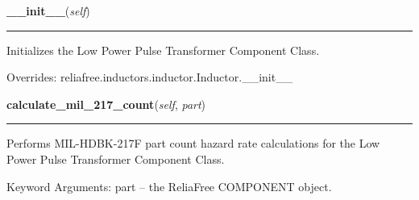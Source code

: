 \hspace{.8\funcindent}\begin{boxedminipage}{\funcwidth}

    \raggedright \textbf{\_\_init\_\_}(\textit{self})

    \vspace{-1.5ex}

    \rule{\textwidth}{0.5\fboxrule}
\setlength{\parskip}{2ex}
    Initializes the Low Power Pulse Transformer Component Class.

\setlength{\parskip}{1ex}
      Overrides: reliafree.inductors.inductor.Inductor.\_\_init\_\_

    \end{boxedminipage}

    \label{reliafree:inductors:transformer:LowPowerPulse:calculate_mil_217_count}

    \vspace{0.5ex}

\hspace{.8\funcindent}\begin{boxedminipage}{\funcwidth}

    \raggedright \textbf{calculate\_mil\_217\_count}(\textit{self}, \textit{part})

    \vspace{-1.5ex}

    \rule{\textwidth}{0.5\fboxrule}
\setlength{\parskip}{2ex}
    Performs MIL-HDBK-217F part count hazard rate calculations for the Low 
    Power Pulse Transformer Component Class.

    Keyword Arguments: part -- the ReliaFree COMPONENT object.

\setlength{\parskip}{1ex}
    \end{boxedminipage}

    \label{reliafree:inductors:transformer:LowPowerPulse:calculate_mil_217_stress}

    \vspace{0.5ex}

